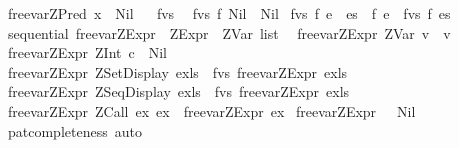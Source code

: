 \begin{isabellebody}
{\isacharbar}\ {\isachardoublequoteopen}free{\isacharunderscore}var{\isacharunderscore}ZPred\ x\ {\isacharequal}\ Nil{\isachardoublequoteclose}\isanewline
\isanewline
\ \isanewline
{}\isamarkupfalse%
\ fvs\isanewline
{}\isanewline
\ \ {\isachardoublequoteopen}fvs\ f\ Nil\ {\isacharequal}\ Nil{\isachardoublequoteclose}\isanewline
{\isacharbar}\ {\isachardoublequoteopen}fvs\ f\ {\isacharparenleft}e\ {\isacharhash}\ es{\isacharparenright}\ {\isacharequal}\ {\isacharparenleft}f\ e\ {\isacharat}\ {\isacharparenleft}fvs\ f\ es{\isacharparenright}{\isacharparenright}{\isachardoublequoteclose}\isanewline
\isanewline
\ \isanewline
{}\isamarkupfalse%
\ {\isacharparenleft}sequential{\isacharparenright}\ free{\isacharunderscore}var{\isacharunderscore}ZExpr\ {\isacharcolon}{\isacharcolon}\ {\isachardoublequoteopen}ZExpr\ {\isasymRightarrow}\ ZVar\ list{\isachardoublequoteclose}\isanewline
{}\isanewline
\ \ {\isachardoublequoteopen}free{\isacharunderscore}var{\isacharunderscore}ZExpr\ {\isacharparenleft}ZVar\ v{\isacharparenright}\ {\isacharequal}\ {\isacharbrackleft}v{\isacharbrackright}{\isachardoublequoteclose}\isanewline
{\isacharbar}\ {\isachardoublequoteopen}free{\isacharunderscore}var{\isacharunderscore}ZExpr\ {\isacharparenleft}ZInt\ c{\isacharparenright}\ {\isacharequal}\ Nil{\isachardoublequoteclose}\isanewline
{\isacharbar}\ {\isachardoublequoteopen}free{\isacharunderscore}var{\isacharunderscore}ZExpr\ {\isacharparenleft}ZSetDisplay\ exls{\isacharparenright}\ {\isacharequal}\ fvs\ free{\isacharunderscore}var{\isacharunderscore}ZExpr\ exls{\isachardoublequoteclose}\isanewline
{\isacharbar}\ {\isachardoublequoteopen}free{\isacharunderscore}var{\isacharunderscore}ZExpr\ {\isacharparenleft}ZSeqDisplay\ exls{\isacharparenright}\ {\isacharequal}\ fvs\ free{\isacharunderscore}var{\isacharunderscore}ZExpr\ exls{\isachardoublequoteclose}\isanewline
{\isacharbar}\ {\isachardoublequoteopen}free{\isacharunderscore}var{\isacharunderscore}ZExpr\ {\isacharparenleft}ZCall\ ex\ ex{}{\isacharparenright}\ {\isacharequal}\ free{\isacharunderscore}var{\isacharunderscore}ZExpr\ ex{}{\isachardoublequoteclose}\isanewline
{\isacharbar}\ {\isachardoublequoteopen}free{\isacharunderscore}var{\isacharunderscore}ZExpr\ {\isacharunderscore}\ {\isacharequal}\ Nil{\isachardoublequoteclose}\isanewline
%
\isadelimproof
%
\endisadelimproof
%
\isatagproof
{}\isamarkupfalse%
\ pat{\isacharunderscore}completeness\ auto%
\endisatagproof
{\isafoldproof}%
%
\isadelimproof
\isanewline
%
\endisadelimproof

\end{isabellebody}
